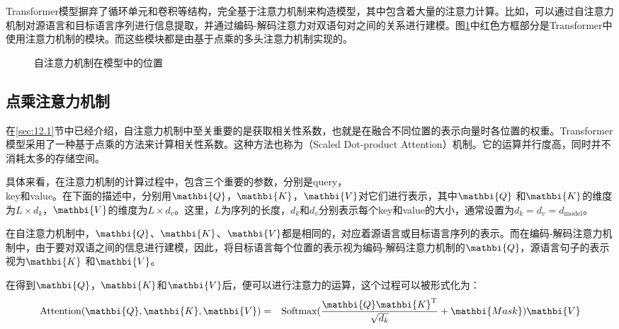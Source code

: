 \parinterval Transformer模型摒弃了循环单元和卷积等结构，完全基于注意力机制来构造模型，其中包含着大量的注意力计算。比如，可以通过自注意力机制对源语言和目标语言序列进行信息提取，并通过编码-解码注意力对双语句对之间的关系进行建模。图\ref{fig:12-9}中红色方框部分是Transformer中使用注意力机制的模块。而这些模块都是由基于点乘的多头注意力机制实现的。

\begin{figure}[htp]
\centering

\caption{自注意力机制在模型中的位置}
\label{fig:12-9}
\end{figure}


\subsection{点乘注意力机制}

\parinterval 在\ref{sec:12.1}节中已经介绍，自注意力机制中至关重要的是获取相关性系数，也就是在融合不同位置的表示向量时各位置的权重。Transformer模型采用了一种基于点乘的方法来计算相关性系数。这种方法也称为{\small{}}（Scaled Dot-product Attention）机制。它的运算并行度高，同时并不消耗太多的存储空间。

\parinterval 具体来看，在注意力机制的计算过程中，包含三个重要的参数，分别是query，\\key和value。在下面的描述中，分别用$\mathbi{Q}$，$\mathbi{K}$，$\mathbi{V}$对它们进行表示，其中$\mathbi{Q}$ 和$\mathbi{K}$的维度为$L\times d_k$，$\mathbi{V}$的维度为$L\times d_v$。这里，$L$为序列的长度，$d_k$和$d_v$分别表示每个key和value的大小，通常设置为$d_k=d_v=d_{\textrm{model}}$。

\parinterval 在自注意力机制中，$\mathbi{Q}$、$\mathbi{K}$、$\mathbi{V}$都是相同的，对应着源语言或目标语言序列的表示。而在编码-解码注意力机制中，由于要对双语之间的信息进行建模，因此，将目标语言每个位置的表示视为编码-解码注意力机制的$\mathbi{Q}$，源语言句子的表示视为$\mathbi{K}$ 和$\mathbi{V}$。

\parinterval 在得到$\mathbi{Q}$，$\mathbi{K}$和$\mathbi{V}$后，便可以进行注意力的运算，这个过程可以被形式化为：
\begin{eqnarray}
\textrm{Attention}(\mathbi{Q},\mathbi{K},\mathbi{V}) &=& \textrm{Softmax}
 ( \frac{\mathbi{Q}\mathbi{K}^{\textrm{T}}} {\sqrt{d_k}} + \mathbi{Mask} ) \mathbi{V}
\label{eq:12-9}
\end{eqnarray}

